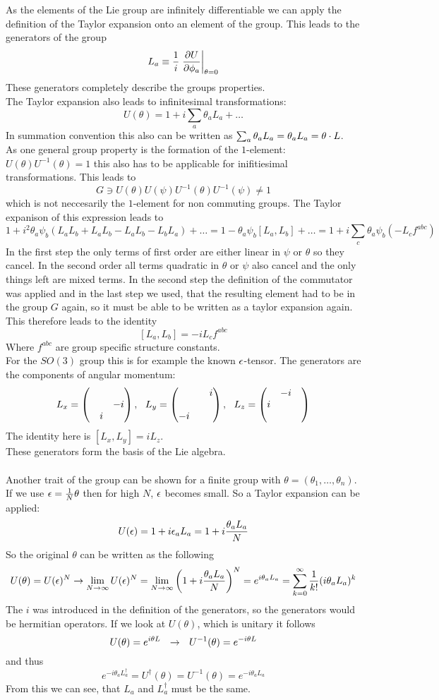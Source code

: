 As the elements of the Lie group are infinitely differentiable we can apply the definition of the Taylor expansion onto an element of the group. This leads to the generators of the group
\[L_a \equiv \frac{1}{i} \left.\frac{\partial U}{\partial \phi_a} \right|_{\theta = 0}\]
These generators completely describe the groups properties.\\
The Taylor expansion also leads to infinitesimal transformations:
\[ U(\theta) = 1 + i \sum_a \theta_a L_a + \ldots\]
In summation convention this also can be written as $\sum_a \theta_a L_a = \theta_a L_a = \theta\cdot L$.\\
As one general group property is the formation of the $1$-element: $U(\theta)U^{-1}(\theta) = 1$ this also has to be applicable for inifitiesimal transformations. This leads to
\[ G \ni U(\theta)U(\psi)U^{-1}(\theta)U^{-1}(\psi) \neq 1\]
which is not neccesarily the $1$-element for non commuting groups. The Taylor expanison of this expression leads to
\[ 1 + i^2 \theta_a\psi_b ( L_aL_b + L_aL_b - L_aL_b - L_bL_a) + \ldots = 1 - \theta_a \psi_b [L_a, L_b]+\ldots = 1 + i \sum_c \theta_a \psi_b ( - L_c f^{abc})\]
In the first step the only terms of first order are either linear in $\psi$ or $\theta$ so they cancel. In the second order all terms quadratic in $\theta$ or $\psi$ also cancel and the only things left are mixed terms. In the second step the definition of the commutator was applied and in the last step we used, that the resulting element had to be in the group $G$ again, so it must be able to be written as a taylor expansion again. This therefore leads to the identity
\[ [ L_a, L_b] = -i L_c f^{abc}\]
Where $f^{abc}$ are group specific structure constants.\\
For the $SO(3)$ group this is for example the known $\epsilon$-tensor. The generators are the components of angular momentum:
\[L_x = \begin{pmatrix}&&\\&&-i\\&i&\end{pmatrix}, ~~ L_y = \begin{pmatrix}&&i\\&&\\-i&&\end{pmatrix}, ~~L_z = \begin{pmatrix}&-i&\\i&&\\&&\end{pmatrix}\]
The identity here is $[L_x,L_y] = iL_z$.\\
These generators form the basis of the Lie algebra.\\
\\
Another trait of the group can be shown for a finite group with $\theta = (\theta_1, \ldots, \theta_n)$. If we use $\epsilon = \frac{1}{N}\theta$ then for high $N$, $\epsilon$ becomes small. So a Taylor expansion can be applied:
\[ U(\epsilon) = 1 + i \epsilon_a L_a = 1 + i \frac{\theta_a L_a}{N}\]
So the original $\theta$ can be written as the following
\[ U(\theta) = U(\epsilon)^N \rightarrow \lim_{N \rightarrow \infty} U(\epsilon) ^N = \lim_{N\rightarrow\infty} \left( 1 + i \frac{\theta_aL_a}{N}\right)^N = e^{i\theta_aL_a} = \sum_{k = 0}^{\infty}\frac{1}{k!}(i\theta_aL_a)^k\]
The $i$ was introduced in the definition of the generators, so the generators would be hermitian operators. If we look at $U(\theta)$, which is unitary it follows
\[ U(\theta) = e^{i\theta L} ~~\rightarrow~~ U^{-1}(\theta) = e^{-i\theta L}\]
and thus
\[ e^{-i\theta_aL_a^\dagger} = U^\dagger(\theta) = U^{-1}(\theta) = e^{-i\theta_aL_a}\]
From this we can see, that $L_a$ and $L_a^\dagger$ must be the same.



